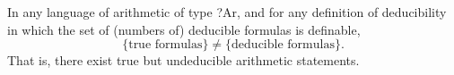 In any language of arithmetic of type ?Ar, and for any definition of deducibility in which the set of (numbers of) deducible formulas is definable,
$$\{\text{true formulas}\} \neq \{\text{deducible formulas}\}.$$
That is, there exist true but undeducible arithmetic statements.
